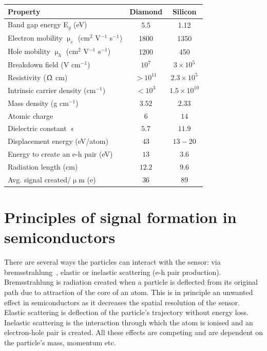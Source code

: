 \documentclass[twoside,12pt]{packages/mytustyle}  %
\begin{document}
\begin{footnotesize}
\begin{center}
\begin{tabular}{   l  c  c   }
\hline
Property & Diamond & Silicon \\
\hline
Band gap energy E$_g$ (eV) & 5.5 & 1.12  \\
Electron mobility $\upmu_e$ (cm$^2$ V$^{-1}$ s$^{-1}$) & 1800 & 1350 \\
Hole mobility $\upmu_h$ (cm$^2$ V$^{-1}$ s$^{-1}$) & 1200 & 450 \\
Breakdown field (V cm$^{-1}$) & $10^{7}$ & $3\times 10^5$ \\
Resistivity ($\Upomega$ cm) & $>10^{11}$  & $2.3\times 10^5$  \\
Intrinsic carrier density (cm$^{-1}$) & $<10^3$ & $1.5\times 10^{10} $ \\
Mass density (g cm$^{-1}$) & $ 3.52$ & $2.33 $ \\
Atomic charge  & $6 $ & $ 14$ \\
Dielectric constant $\upvarepsilon$ & $5.7 $ & $11.9 $ \\
Displacement energy (eV/atom) & $43 $ & $13-20 $ \\
Energy to create an e-h pair  (eV) & $13 $ & $ 3.6$ \\
Radiation length (cm) & $ 12.2$ & $9.6 $ \\
Avg. signal created/$\upmu$m (e) & 36 & 89 \\\hline
\end{tabular}
\label{tab:semicompare}
\end{center}
\end{footnotesize}


\section{Principles of signal formation in semiconductors}
\label{sec:princsigfor}
There are several ways the particles can interact with the sensor: via bremsstrahlung~\cite{}, elastic or inelastic scattering (e-h pair production). Bremsstrahlung is radiation created when a particle is deflected from its original path due to attraction of the core of an atom. This is in principle an unwanted effect in semiconductors as it decreases the spatial resolution of the sensor. Elastic scattering is deflection of the particle's trajectory without energy loss. Inelastic scattering is the interaction through which the atom is ionised and an electron-hole pair is created. All these effects are competing and are dependent on the particle's mass, momentum etc. 
\end{document}
